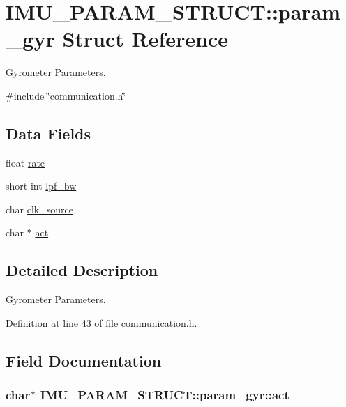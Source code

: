 \hypertarget{structIMU__PARAM__STRUCT_1_1param__gyr}{
\section{IMU\_\-PARAM\_\-STRUCT::param\_\-gyr Struct Reference}
\label{structIMU__PARAM__STRUCT_1_1param__gyr}
}


Gyrometer Parameters.  




{\ttfamily \#include \char`\"{}communication.h\char`\"{}}

\subsection*{Data Fields}
\begin{DoxyCompactItemize}
\item 
float \hyperlink{structIMU__PARAM__STRUCT_1_1param__gyr_a5aa70e1e9634411c89aacfbc570cc91c}{rate}
\item 
short int \hyperlink{structIMU__PARAM__STRUCT_1_1param__gyr_aa612f7299b43a1bf1fc597688c2fa02d}{lpf\_\-bw}
\item 
char \hyperlink{structIMU__PARAM__STRUCT_1_1param__gyr_aca3b791cb480f2da4703d4c256a7de48}{clk\_\-source}
\item 
char $\ast$ \hyperlink{structIMU__PARAM__STRUCT_1_1param__gyr_a909d153e794ec443be04625ce00e4178}{act}
\end{DoxyCompactItemize}


\subsection{Detailed Description}
Gyrometer Parameters. 

Definition at line 43 of file communication.h.



\subsection{Field Documentation}
\hypertarget{structIMU__PARAM__STRUCT_1_1param__gyr_a909d153e794ec443be04625ce00e4178}{
\subsubsection[{act}]{\setlength{\rightskip}{0pt plus 5cm}char$\ast$ {\bf IMU\_\-PARAM\_\-STRUCT::param\_\-gyr::act}}}
\label{structIMU__PARAM__STRUCT_1_1param__gyr_a909d153e794ec443be04625ce00e4178}


